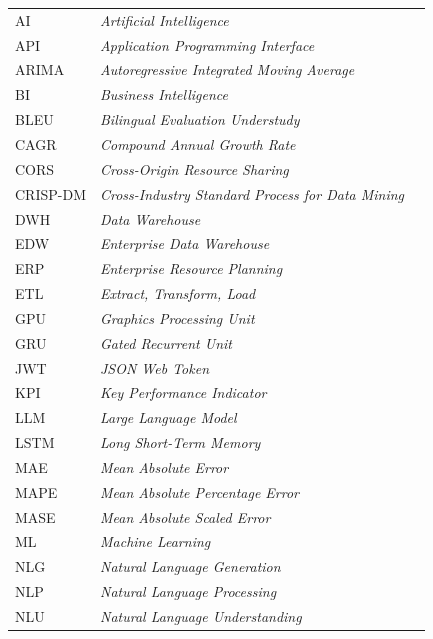 \begin{longtable}{@{} l >{\raggedright\arraybackslash}p{7.5cm} c @{}}
AI & \textit{Artificial Intelligence} & \pageref{abbr:AI} \\
API & \textit{Application Programming Interface} & \pageref{abbr:API} \\
ARIMA & \textit{Autoregressive Integrated Moving Average} & \pageref{abbr:ARIMA} \\
BI & \textit{Business Intelligence} & \pageref{abbr:BI} \\
BLEU & \textit{Bilingual Evaluation Understudy} & \pageref{abbr:BLEU} \\
CAGR & \textit{Compound Annual Growth Rate} & \pageref{abbr:CAGR} \\
CORS & \textit{Cross-Origin Resource Sharing} & \pageref{abbr:CORS} \\
CRISP-DM & \textit{Cross-Industry Standard Process for Data Mining} & \pageref{abbr:CRISPDM} \\
DWH & \textit{Data Warehouse} & \pageref{abbr:DWH} \\
EDW & \textit{Enterprise Data Warehouse} & \pageref{abbr:EDW} \\
ERP & \textit{Enterprise Resource Planning} & \pageref{abbr:ERP} \\
ETL & \textit{Extract, Transform, Load} & \pageref{abbr:ETL} \\
GPU & \textit{Graphics Processing Unit} & \pageref{abbr:GPU} \\
GRU & \textit{Gated Recurrent Unit} & \pageref{abbr:GRU} \\
JWT & \textit{JSON Web Token} & \pageref{abbr:JWT} \\
KPI & \textit{Key Performance Indicator} & \pageref{abbr:KPI} \\
LLM & \textit{Large Language Model} & \pageref{abbr:LLM} \\
LSTM & \textit{Long Short-Term Memory} & \pageref{abbr:LSTM} \\
MAE & \textit{Mean Absolute Error} & \pageref{abbr:MAE} \\
MAPE & \textit{Mean Absolute Percentage Error} & \pageref{abbr:MAPE} \\
MASE & \textit{Mean Absolute Scaled Error} & \pageref{abbr:MASE} \\
ML & \textit{Machine Learning} & \pageref{abbr:ML} \\
NLG & \textit{Natural Language Generation} & \pageref{abbr:NLG} \\
NLP & \textit{Natural Language Processing} & \pageref{abbr:NLP} \\
NLU & \textit{Natural Language Understanding} & \pageref{abbr:NLU} \\

\end{longtable}
